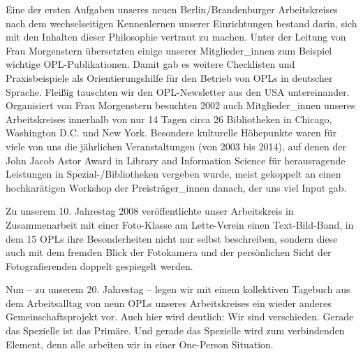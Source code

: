 \documentclass[a4paper,
fontsize=11pt,
oneside,
numbers=noperiodatend,
parskip=half-,
bibliography=totoc,
final
]{scrartcl}
\begin{document}
Eine der ersten Aufgaben unseres neuen Berlin/Brandenburger
Arbeitskreises nach dem wechselseitigen Kennenlernen unserer
Einrichtungen bestand darin, sich mit den Inhalten dieser Philosophie
vertraut zu machen. Unter der Leitung von Frau Morgenstern übersetzten
einige unserer Mitglieder\_innen zum Beispiel wichtige
OPL-Publikationen. Damit gab es weitere Checklisten und Praxisbeispiele
als Orientierungshilfe für den Betrieb von OPLs in deutscher Sprache.
Fleißig tauschten wir den OPL-Newsletter aus den USA untereinander.
Organisiert von Frau Morgenstern besuchten 2002 auch Mitglieder\_innen
unseres Arbeitskreises innerhalb von nur 14 Tagen circa 26 Bibliotheken
in Chicago, Washington D.C. und New York. Besondere kulturelle
Höhepunkte waren für viele von uns die jährlichen Veranstaltungen (von
2003 bis 2014), auf denen der John Jacob Astor Award in Library and
Information Science für herausragende Leistungen in
Spezial-/Bibliotheken vergeben wurde, meist gekoppelt an einen
hochkarätigen Workshop der Preisträger\_innen danach, der uns viel Input
gab.

Zu unserem 10. Jahrestag 2008 veröffentlichte unser Arbeitskreis in
Zusammenarbeit mit einer Foto-Klasse am Lette-Verein einen
Text-Bild-Band, in dem 15 OPLs ihre Besonderheiten nicht nur selbst
beschreiben, sondern diese auch mit dem fremden Blick der Fotokamera und
der persönlichen Sicht der Fotografierenden doppelt gespiegelt werden.

Nun -- zu unserem 20. Jahrestag -- legen wir mit einem kollektiven
Tagebuch aus dem Arbeitsalltag von neun OPLs unseres Arbeitskreises ein
wieder anderes Gemeinschaftsprojekt vor. Auch hier wird deutlich: Wir
sind verschieden. Gerade das Spezielle ist das Primäre. Und gerade das
Spezielle wird zum verbindenden Element, denn alle arbeiten wir in einer
One-Person Situation.
\end{document}
